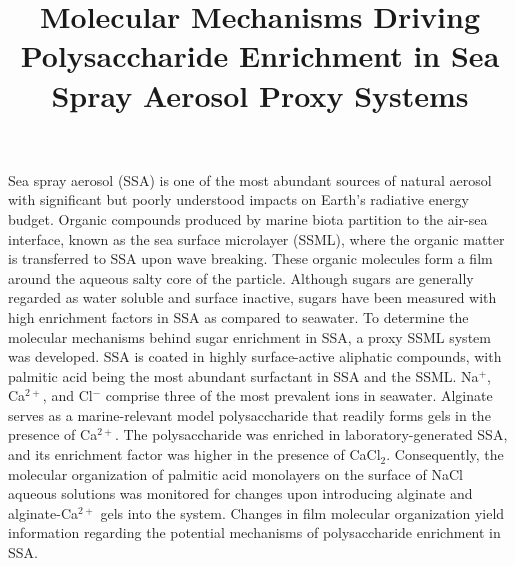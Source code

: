 \documentclass[11pt]{article}
\title{Molecular Mechanisms Driving Polysaccharide Enrichment in Sea Spray Aerosol Proxy Systems}
\date{\vspace{-8ex}}
\begin{document}
\maketitle

Sea spray aerosol (SSA) is one of the most abundant sources of natural aerosol with significant but poorly understood impacts on Earth's radiative energy budget.\cite{deleeuwProductionFluxSea2011,ipcc2014ClimateChange20132014} Organic compounds produced by marine biota partition to the air-sea interface, known as the sea surface microlayer (SSML), where the organic matter is transferred to SSA upon wave breaking.\cite{quinnChemistryRelatedProperties2015} These organic molecules form a film around the aqueous salty core of the particle.\cite{tervahattuNewEvidenceOrganic2002} Although sugars are generally regarded as water soluble and surface inactive, sugars have been measured with high enrichment factors in SSA as compared to seawater.\cite{russellCarbohydratelikeCompositionSubmicron2010,jayarathneEnrichmentSaccharidesDivalent2016} To determine the molecular mechanisms behind sugar enrichment in SSA, a proxy SSML system was developed. SSA is coated in highly surface-active aliphatic compounds, with palmitic acid being the most abundant surfactant in SSA and the SSML.\cite{cochranAnalysisOrganicAnionic2016} Na$^+$, Ca$^{2+}$, and Cl$^-$ comprise three of the most prevalent ions in seawater.\cite{milleroCompositionStandardSeawater2008a,milleroChemicalOceanography2013} Alginate serves as a marine-relevant model polysaccharide that readily forms gels in the presence of Ca$^{2+}$.\cite{fangMultipleStepsCritical2007,liCrossLinkedPolysaccharideAssemblies2013,sunMolecularDynamicsSimulations2014,allerSizeresolvedCharacterizationPolysaccharidic2017} The polysaccharide was enriched in laboratory-generated SSA, and its enrichment factor was higher in the presence of CaCl$_2$.\cite{haseneczSeaSprayAerosol2018} Consequently, the molecular organization of palmitic acid monolayers on the surface of NaCl aqueous solutions was monitored for changes upon introducing alginate and alginate-Ca$^{2+}$ gels into the system. Changes in film molecular organization yield information regarding the potential mechanisms of polysaccharide enrichment in SSA. \par
\end{document}
